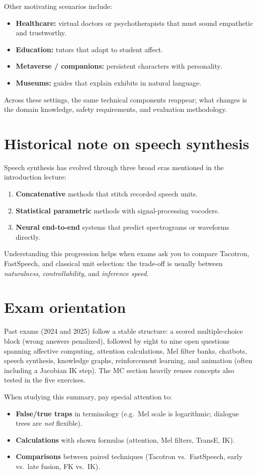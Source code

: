 Other motivating scenarios include:
\begin{itemize}
  \item \textbf{Healthcare:} virtual doctors or psychotherapists that must sound empathetic and trustworthy.
  \item \textbf{Education:} tutors that adapt to student affect.
  \item \textbf{Metaverse / companions:} persistent characters with personality.
  \item \textbf{Museums:} guides that explain exhibits in natural language.
\end{itemize}

Across these settings, the same technical components reappear; what changes is the domain knowledge, safety requirements, and evaluation methodology.

\section{Historical note on speech synthesis}

Speech synthesis has evolved through three broad eras mentioned in the introduction lecture:
\begin{enumerate}
  \item \textbf{Concatenative} methods that stitch recorded speech units.
  \item \textbf{Statistical parametric} methods with signal-processing vocoders.
  \item \textbf{Neural end-to-end} systems that predict spectrograms or waveforms directly.
\end{enumerate}

Understanding this progression helps when exams ask you to compare Tacotron, FastSpeech, and classical unit selection: the trade-off is usually between \emph{naturalness}, \emph{controllability}, and \emph{inference speed}.

\section{Exam orientation}

Past exams (2024 and 2025) follow a stable structure: a scored multiple-choice block (wrong answers penalized), followed by eight to nine open questions spanning affective computing, attention calculations, Mel filter banks, chatbots, speech synthesis, knowledge graphs, reinforcement learning, and animation (often including a Jacobian IK step). The MC section heavily reuses concepts also tested in the five exercises.

When studying this summary, pay special attention to:
\begin{itemize}
  \item \textbf{False/true traps} in terminology (e.g.\ Mel scale is logarithmic; dialogue trees are \emph{not} flexible).
  \item \textbf{Calculations} with shown formulas (attention, Mel filters, TransE, IK).
  \item \textbf{Comparisons} between paired techniques (Tacotron vs.\ FastSpeech, early vs.\ late fusion, FK vs.\ IK).
\end{itemize}
